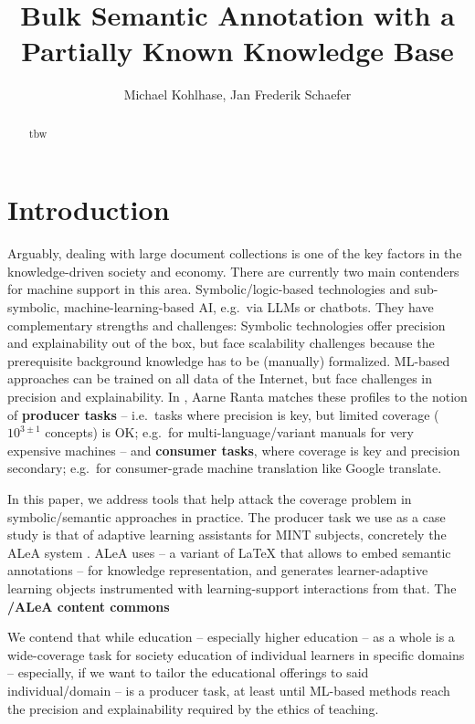 \documentclass{llncs}
\title{Bulk Semantic Annotation with a Partially Known Knowledge Base}
\author{Michael Kohlhase, Jan Frederik Schaefer}
\institute{Computer Science, FAU Erlangen N\"urnberg, Germany}
\newcommand\ALeA{\textsf{ALeA}\xspace}
\begin{document}
\maketitle
\begin{abstract}
tbw
\end{abstract}

\section{Introduction}
Arguably, dealing with large document collections is one of the key factors in the
knowledge-driven society and economy. There are currently two main contenders for machine
support in this area. Symbolic/logic-based technologies and sub-symbolic,
machine-learning-based AI, e.g.\ via LLMs or chatbots. They have complementary strengths
and challenges: Symbolic technologies offer precision and explainability out of the box,
but face scalability challenges because the prerequisite background knowledge has to be
(manually) formalized. ML-based approaches can be trained on all data of the Internet, but
face challenges in precision and explainability. In \cite{Ranta:atcp17},
Aarne Ranta matches these profiles to the notion of \textbf{producer tasks} -- i.e.\ tasks
where precision is key, but limited coverage ($10^{3\pm1}$ concepts) is OK;
e.g.\ for multi-language/variant manuals for very
expensive machines -- and \textbf{consumer tasks}, where coverage is key and
precision secondary; e.g.\ for consumer-grade machine translation like \textsf{Google translate}.

In this paper, we address tools that help attack the coverage problem in symbolic/semantic
approaches in practice. The producer task we use as a case study is that of adaptive
learning assistants for MINT subjects, concretely the \ALeA system \cite{BerBetChu:lssmkm23}.
\ALeA uses \sTeX \cite{MueKo:sdstex22,sTeX:github:on} -- a
variant of {\LaTeX} that allows to embed semantic annotations -- for knowledge
representation, and generates learner-adaptive learning objects instrumented with
learning-support interactions from that. The \textbf{\sTeX/\ALeA content commons}

We contend that while education -- especially higher education -- as a whole is a
wide-coverage task for society education of individual learners in specific domains --
especially, if we want to tailor the educational offerings to said individual/domain -- is
a producer task, at least until ML-based methods reach the precision and explainability
required by the ethics of teaching.
\end{document}

